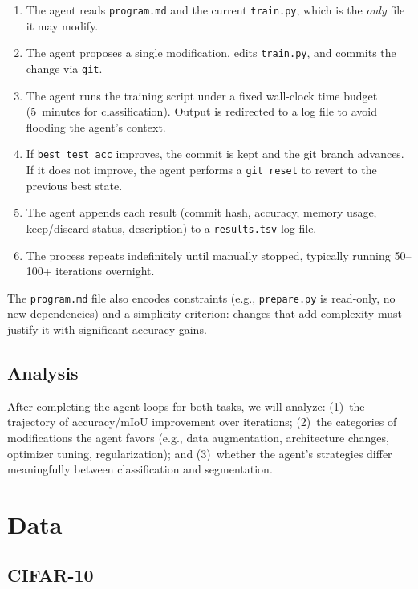 \documentclass[10pt,twocolumn,letterpaper]{article}
\begin{document}
\begin{enumerate}
    \item The agent reads \texttt{program.md} and the current \texttt{train.py}, which is the \emph{only} file it may modify.
    \item The agent proposes a single modification, edits \texttt{train.py}, and commits the change via \texttt{git}.
    \item The agent runs the training script under a fixed wall-clock time budget (5~minutes for classification). Output is redirected to a log file to avoid flooding the agent's context.
    \item If \texttt{best\_test\_acc} improves, the commit is kept and the git branch advances. If it does not improve, the agent performs a \texttt{git reset} to revert to the previous best state.
    \item The agent appends each result (commit hash, accuracy, memory usage, keep/discard status, description) to a \texttt{results.tsv} log file.
    \item The process repeats indefinitely until manually stopped, typically running 50--100+ iterations overnight.
\end{enumerate}

The \texttt{program.md} file also encodes constraints (e.g., \texttt{prepare.py} is read-only, no new dependencies) and a simplicity criterion: changes that add complexity must justify it with significant accuracy gains.

\subsection{Analysis}

After completing the agent loops for both tasks, we will analyze: (1)~the trajectory of accuracy/mIoU improvement over iterations; (2)~the categories of modifications the agent favors (e.g., data augmentation, architecture changes, optimizer tuning, regularization); and (3)~whether the agent's strategies differ meaningfully between classification and segmentation.


\section{Data}

\subsection{CIFAR-10}
\end{document}
